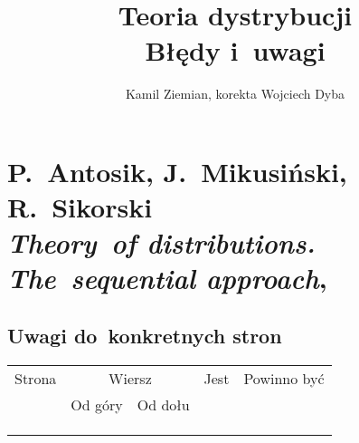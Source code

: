 \documentclass[a4paper,11pt]{article}
\title{Teoria dystrybucji \\
  {\Large Błędy i~uwagi}}
\author{Kamil Ziemian, korekta Wojciech Dyba}
\begin{document}





\maketitle





\section{P.~Antosik, J.~Mikusiński, R.~Sikorski \\
  \textit{Theory~of distributions. The~sequential
    approach},
  \cite{AntosikMikusinskiSikorskiTheoryOfDistributionsETC1973}}



\subsection{Uwagi do~konkretnych stron}

\label{subsec:AMS-Theory-ETC-Uwagi-do-konkrentych-stron}




\noindent
{}








\begin{center}

  \begin{tabular}{|c|c|c|c|c|}
    \hline
    Strona & \multicolumn{2}{c|}{Wiersz} & Jest
                              & Powinno być \\ \cline{2-3}
    & Od góry & Od dołu & & \\
    \hline
    & & & & \\
    & & & & \\
    & & & & \\
    \hline
  \end{tabular}

\end{center}
\end{document}
